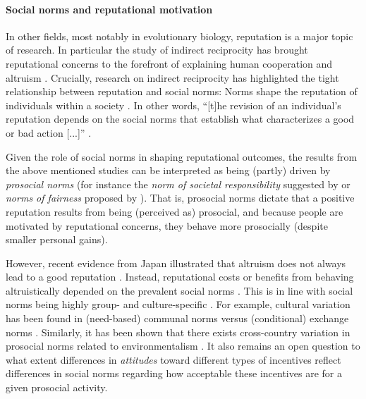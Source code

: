 \documentclass[AER]{AEA}
\begin{document}
\paragraph{Social norms and reputational motivation}

In other fields, most notably in evolutionary biology, reputation is a major topic of research. In particular the study of indirect reciprocity \cite[i.e., receiving the benefit from an action in the future based on one's reputation, distilled in “I help you and somebody else helps me”;][]{nowak_evolution_2005} has brought reputational concerns to the forefront of explaining human cooperation and altruism \citep{nowak_evolution_1998}. Crucially, research on indirect reciprocity has highlighted the tight relationship between reputation and social norms: Norms shape the reputation of individuals within a society \citep{nowak_evolution_2005, alexander_biology_1987}. In other words, “[t]he revision of an individual’s reputation depends on the social norms that establish what characterizes a good or bad action [...]” \cite[p.~242]{santos_social_2018}.

Given the role of social norms in shaping reputational outcomes, the results from the above mentioned studies \cite[i.e., increased prosocial behavior when reputations are at stake; e.g.,][]{ariely_doing_2009, hoffman_social_1996} can be interpreted as being (partly) driven by \textit{prosocial norms} (for instance the \textit{norm of societal responsibility} suggested by \cite{cialdini_social_1998} or \textit{norms of fairness} proposed by \cite{fehr_theory_1999}). That is, prosocial norms dictate that a positive reputation results from being (perceived as) prosocial, and because people are motivated by reputational concerns, they behave more prosocially (despite smaller personal gains). 

However, recent evidence from Japan illustrated that altruism does not always lead to a good reputation \citep{kawamura_altruism_2020}. Instead, reputational costs or benefits from behaving altruistically depended on the prevalent social norms \citep{kawamura_altruism_2020}. This is in line with social norms being highly group- and culture-specific \citep{nowak_evolution_2005, alexander_biology_1987}. For example, cultural variation has been found in (need-based) communal norms versus (conditional) exchange norms \citep{miller_cultural_2017}. Similarly, it has been shown that there exists cross-country variation in prosocial norms related to environmentalism \citep{torgler_environmental_2009}. It also remains an open question to what extent differences in \textit{attitudes} toward different types of incentives \citep{lacetera_economic_2013} reflect differences in social norms regarding how acceptable these incentives are for a given prosocial activity.
\end{document}
